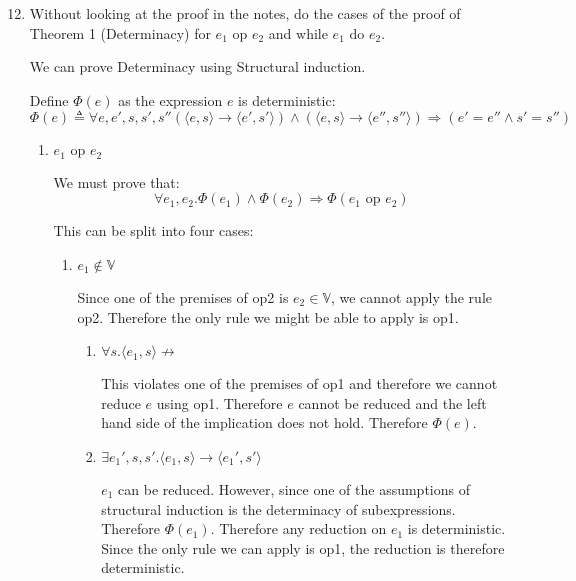 \documentclass[10pt,\jkfside,a4paper]{article}
\begin{document}
\begin{enumerate}

\setcounter{enumi}{11}

\item Without looking at the proof in the notes, do the cases of the proof
of Theorem 1 (Determinacy) for $e_1 \text{ op } e_2$ and
$\text{while } e_1 \text{ do } e_2$.

We can prove Determinacy using Structural induction.

Define $\Phi(e)$ as the expression $e$ is deterministic:
\[
\Phi(e) \triangleq \forall e, e', s, s', s'' (\langle e, s \rangle
\to \langle e', s' \rangle) \wedge (\langle e, s \rangle
\to \langle e'', s'' \rangle) \Longrightarrow (e' = e'' \wedge s'
= s'')
\]

\begin{enumerate}[label=\textbf{Case}]

\item $e_1 \text{ op } e_2$

We must prove that:
\[
\forall e_1, e_2. \Phi(e_1) \wedge \Phi(e_2) \Longrightarrow \Phi(e_1 \text{ op } e_2)
\]

This can be split into four cases:

\begin{enumerate}[label=\textbf{Case}]

\item $e_1 \notin \mathbb{V}$

Since one of the premises of op2 is $e_2 \in \mathbb{V}$,
we cannot apply the rule op2. Therefore the only rule we might be
able to apply is op1.

\begin{enumerate}[label=\textbf{Case}]

\item $\forall s. \langle e_1, s \rangle \not\to $

This violates one of the premises of op1 and therefore we cannot reduce
$e$ using op1. Therefore $e$ cannot be reduced and the left hand side of
the implication does not hold. Therefore $\Phi(e)$.

\item $\exists e_1', s, s'. \langle e_1, s \rangle \to \langle
e_1', s' \rangle $

$e_1$ can be reduced. However, since one of the assumptions of structural
induction is the determinacy of subexpressions. Therefore $\Phi(e_1)$.
Therefore any reduction on $e_1$ is deterministic. Since the only rule we
can apply is op1, the reduction is therefore deterministic.


\end{enumerate}
\end{enumerate}
\end{enumerate}
\end{enumerate}
\end{document}

